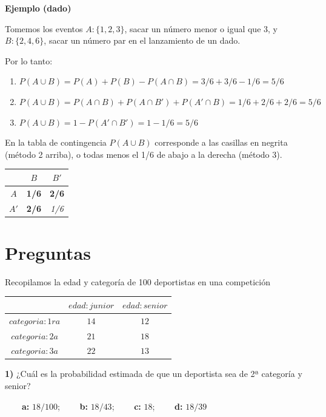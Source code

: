 \documentclass[
]{book}
\begin{document}
\textbf{Ejemplo (dado)}

Tomemos los eventos \(A:\{1,2,3\}\), sacar un número menor o igual que \(3\), y \(B:\{2,4,6\}\), sacar un número par en el lanzamiento de un dado.

Por lo tanto:

\begin{enumerate}
\def\labelenumi{\arabic{enumi})}
\item
  \(P(A \cup B)=P(A) + P(B) - P(A\cap B)=3/6+3/6-1/6=5/6\)
\item
  \(P(A \cup B)=P(A \cap B)+P(A\cap B')+P(A'\cap B)=1/6+2/6+2/6=5/6\)
\item
  \(P(A \cup B)=1-P(A'\cap B')= 1-1/6=5/6\)
\end{enumerate}

En la tabla de contingencia \(P(A \cup B)\) corresponde a las casillas en negrita (método 2 arriba), o todas menos el 1/6 de abajo a la derecha (método 3).

\begin{longtable}[]{@{}ccc@{}}
\toprule\noalign{}
& \(B\) & \(B'\) \\
\midrule\noalign{}
\endhead
\bottomrule\noalign{}
\endlastfoot
\(A\) & \textbf{1/6} & \textbf{2/6} \\
\(A'\) & \textbf{2/6} & \emph{1/6} \\
\end{longtable}

\hypertarget{preguntas-1}{%
\section{Preguntas}\label{preguntas-1}}

Recopilamos la edad y categoría de 100 deportistas en una competición

\begin{longtable}[]{@{}ccc@{}}
\toprule\noalign{}
& \(edad:junior\) & \(edad:senior\) \\
\midrule\noalign{}
\endhead
\bottomrule\noalign{}
\endlastfoot
\(categoria:1ra\) & \(14\) & \(12\) \\
\(categoria:2a\) & \(21\) & \(18\) \\
\(categoria:3a\) & \(22\) & \(13\) \\
\end{longtable}

\textbf{1)} ¿Cuál es la probabilidad estimada de que un deportista sea de 2ª categoría y senior?

\textbf{\(\qquad\)a:} \(18/100\); \textbf{\(\qquad\)b:} \(18/43\); \textbf{\(\qquad\)c:} \(18\); \textbf{\(\qquad\)d:} \(18/39\)
\end{document}
